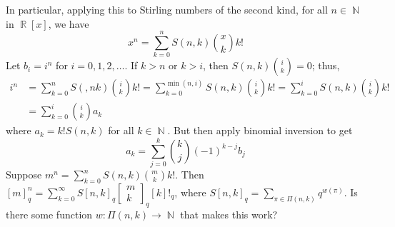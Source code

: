 \documentclass[11pt, a4paper]{memoir}
\DeclareMathOperator{\N}{{\mathbb{N}}}
\DeclareMathOperator{\R}{{\mathbb{R}}}
\theoremstyle{change}
\theoremstyle{plain}
\theoremstyle{nonumberplain}
\newcommand{\sqbinom}[2]{\begin{bmatrix}#1\\#2\end{bmatrix}}
\numberwithin{equation}{section}
\begin{document}
In particular, applying this to Stirling numbers of the second kind, for all $n\in\N$ in $\R[x]$, we have
\begin{equation*}
    x^n=\sum_{k=0}^n S(n,k)\binom{x}{k}k!
\end{equation*}
Let $b_i=i^n$ for $i=0,1,2,\ldots$.
If $k>n$ or $k>i$, then $S(n,k)\binom{i}{k}=0$; thus,
\begin{align*}
    i^n &= \sum_{k=0}^nS(,nk)\binom{i}{k}k! = \sum_{k=0}^{\min(n,i)}S(n,k)\binom{i}{k}k!=\sum_{k=0}^i S(n,k)\binom{i}{k}k!\\
        &= \sum_{k=0}^i\binom{i}{k}a_k
\end{align*}
where $a_k=k!S(n,k)$ for all $k\in\N$.
But then apply binomial inversion to get
\begin{equation*}
    a_k=\sum_{j=0}^k\binom{k}{j}(-1)^{k-j}b_j
\end{equation*}
Suppose $m^n=\sum_{k=0}^n S(n,k)\binom{m}{k}k!$.
Then $[m]_q^n=\sum_{k=0}^\infty S[n,k]_q\sqbinom{m}{k}_q[k]!_q$, where $S[n,k]_q=\sum_{\pi\in\Pi(n,k)}q^{w(\pi)}$.
Is there some function $w:\Pi(n,k)\to\N$ that makes this work?
\end{document}
